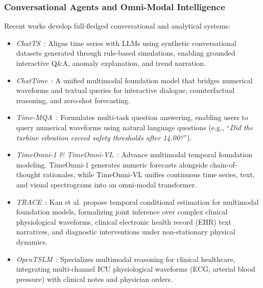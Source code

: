 \subsubsection{Conversational Agents and Omni-Modal Intelligence}
Recent works develop full-fledged conversational and analytical systems:
\begin{itemize}[leftmargin=*]
    \item \emph{ChatTS}~\cite{xie2024chatts}: Aligns time series with LLMs using synthetic conversational datasets generated through rule-based simulations, enabling grounded interactive Q\&A, anomaly explanation, and trend narration.
    \item \emph{ChatTime}~\cite{zhang2024chattime}: A unified multimodal foundation model that bridges numerical waveforms and textual queries for interactive dialogue, counterfactual reasoning, and zero-shot forecasting.
    \item \emph{Time-MQA}~\cite{jin2025timemqa}: Formulates multi-task question answering, enabling users to query numerical waveforms using natural language questions (e.g., ``\emph{Did the turbine vibration exceed safety thresholds after 14:00?}'').
    \item \emph{TimeOmni-1 \& TimeOmni-VL}~\cite{jin2025timeomni,guan2026timeomnivl}: Advance multimodal temporal foundation modeling. TimeOmni-1 generates numeric forecasts alongside chain-of-thought rationales, while TimeOmni-VL unifies continuous time series, text, and visual spectrograms into an omni-modal transformer.
    \item \emph{TRACE}~\cite{kan2026trace}: Kan et al. propose temporal conditional estimation for multimodal foundation models, formalizing joint inference over complex clinical physiological waveforms, clinical electronic health record (EHR) text narratives, and diagnostic interventions under non-stationary physical dynamics.
    \item \emph{OpenTSLM}~\cite{raj2025opentslm}: Specializes multimodal reasoning for clinical healthcare, integrating multi-channel ICU physiological waveforms (ECG, arterial blood pressure) with clinical notes and physician orders.
\end{itemize}

